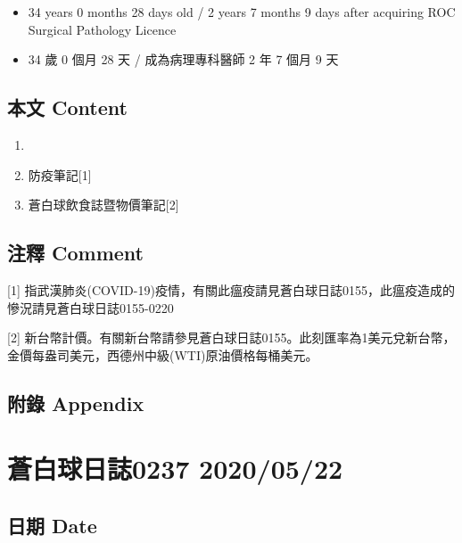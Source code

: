 \documentclass[
]{article}
\providecommand{\tightlist}{%
  \setlength{\itemsep}{0pt}\setlength{\parskip}{0pt}}
\begin{document}
\begin{itemize}
\tightlist
\item
  34 years 0 months 28 days old / 2 years 7 months 9 days after
  acquiring ROC Surgical Pathology Licence
\item
  34 歲 0 個月 28 天 / 成為病理專科醫師 2 年 7 個月 9 天
\end{itemize}

\hypertarget{ux672cux6587-content-20}{%
\subsection{本文 Content}\label{ux672cux6587-content-20}}

\begin{enumerate}
\def\labelenumi{\arabic{enumi}.}
\item
\item
  防疫筆記{[}1{]}
\item
  蒼白球飲食誌暨物價筆記{[}2{]}
\end{enumerate}

\hypertarget{ux6ce8ux91cb-comment-20}{%
\subsection{注釋 Comment}\label{ux6ce8ux91cb-comment-20}}

{[}1{]}
指武漢肺炎(COVID-19)疫情，有關此瘟疫請見蒼白球日誌0155，此瘟疫造成的慘況請見蒼白球日誌0155-0220

{[}2{]}
新台幣計價。有關新台幣請參見蒼白球日誌0155。此刻匯率為1美元兌新台幣，金價每盎司美元，西德州中級(WTI)原油價格每桶美元。

\hypertarget{ux9644ux9304-appendix-20}{%
\subsection{附錄 Appendix}\label{ux9644ux9304-appendix-20}}

\hypertarget{ux84bcux767dux7403ux65e5ux8a8c0237-20200522}{%
\section{蒼白球日誌0237
2020/05/22}\label{ux84bcux767dux7403ux65e5ux8a8c0237-20200522}}

\hypertarget{ux65e5ux671f-date-21}{%
\subsection{日期 Date}\label{ux65e5ux671f-date-21}}
\end{document}
